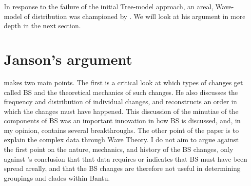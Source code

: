 \documentclass[output=paper,colorlinks,citecolor=brown
]{langscibook}
\begin{document}
In response to the failure of the initial Tree-model approach, an areal, Wave-model of distribution was championed by \citet{Janson2007}. We will look at his argument in more depth in the next section.


\section{Janson's argument}
\label{sec:kieffer:janson}

\citet{Janson2007} makes two main points. The first is a critical look at which types of changes get called BS and the theoretical mechanics of such changes. He also discusses the frequency and distribution of individual changes, and reconstructs an order in which the changes must have happened. This discussion of the minutiae of the components of BS was an important innovation in how BS is discussed, and, in my opinion, contains several breakthroughs. The other point of the paper is to explain the complex data through Wave Theory. I do not aim to argue against the first point on the nature, mechanics, and history of the BS changes, only against \citeauthor{Janson2007}’s conclusion that that data requires or indicates that BS must have been spread areally, and that the BS changes are therefore not useful in determining groupings and clades within Bantu.
\end{document}
